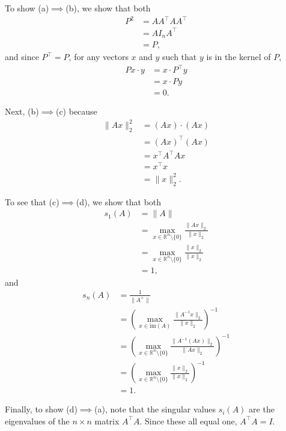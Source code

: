\documentclass{report}
\theoremstyle{definition}
\newenvironment{exercise}[1]{
  \renewcommand\theexerciseimpl{#1}
  \exerciseimpl
}{\endexerciseimpl}
\begin{document}
\begin{exercise}{4.1.4}
  To show (a)$\implies$(b), we show that both
  \begin{align*}
    P^2 & = A A^\top A A^\top \\
    & = A I_n A^\top \\
    & = P,
  \end{align*}
  and since $P^\top = P$, for any vectors $x$ and $y$ such that $y$ is in the kernel of $P$,
  \begin{align*}
    P x \cdot y & = x \cdot P^\top y \\
    & = x \cdot P y \\
    & = 0.
  \end{align*}

  Next, (b)$\implies$(c) because
  \begin{align*}
    \|A x\|_2^2 & = (A x) \cdot (A x) \\
    & = (A x)^\top (A x) \\
    & = x^\top A^\top A x \\
    & = x^\top x \\
    & = \|x\|_2^2.
  \end{align*}

  To see that (c)$\implies$(d), we show that both
  \begin{align*}
    s_1(A) & = \|A\| \\
    & = \max_{x \in \mathbb{R}^n \setminus \{0\}} \frac{\|A x\|_2}{\|x\|_2} \\
    & = \max_{x \in \mathbb{R}^n \setminus \{0\}} \frac{\|x\|_2}{\|x\|_2} \\
    & = 1,
  \end{align*}
  and
  \begin{align*}
    s_n(A) & = \frac{1}{\|A^+\|} \\
    & = \left( \max_{x \in \mathrm{im}(A)} \frac{\|A^{-1} x\|_2}{\|x\|_2} \right)^{-1} \\
    & = \left( \max_{x \in \mathbb{R}^n \setminus \{0\}} \frac{\|A^{-1}(A x)\|_2}{\|A x\|_2} \right)^{-1} \\
    & = \left( \max_{x \in \mathbb{R}^n \setminus \{0\}} \frac{\|x\|_2}{\|x\|_2} \right)^{-1} \\
    & = 1.
  \end{align*}

  Finally, to show (d)$\implies$(a), note that the singular values $s_i(A)$ are the eigenvalues of the $n \times n$ matrix $A^\top A$.
  Since these all equal one, $A^\top A = I$.
\end{exercise}
\end{document}
